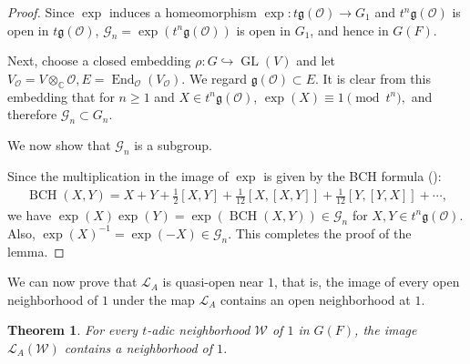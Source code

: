 \documentclass[11pt]{amsart}
\numberwithin{equation}{section}
\newtheorem{theorem}{Theorem}[section]
\theoremstyle{definition}
\theoremstyle{remark}
\begin{document}
\begin{proof}
Since $\exp$ induces a homeomorphism $\exp:t\mathfrak{g}(\mathcal{O})\rightarrow G_{1}$ and $t^n\mathfrak g(\mathcal O)$ is open in
$t\mathfrak g(\mathcal O)$, $\mathcal G_n=\exp(t^n\mathfrak{g}(\mathcal{O}))$ is open in $G_1$, and hence in
$G(F)$.

Next, choose a closed embedding $\rho:G\hookrightarrow\operatorname{GL}(V)$ and let $V_{\mathcal O}=V\otimes_{\mathbb C}\mathcal O, E=\operatorname{End}_{\mathcal O}(V_{\mathcal O}).$
We regard $\mathfrak g(\mathcal{O}) \subset E.$
It is clear from this embedding that for $n\geq 1$ and $X\in t^n\mathfrak{g}(\mathcal{O})$, $\exp(X)\equiv1\pmod{t^n},$ and therefore $\mathcal G_n\subset G_n.$ 

We now show that $\mathcal G_n$ is a subgroup.

Since the multiplication in the image of $\exp$ is given by the BCH formula (\cite[Chapter~2, Section~6]{Bou}):
\begin{align}\label{eq:BCH}
  \operatorname{BCH}(X,Y)
  =
  X+Y+\frac12[X,Y]
  +\frac1{12}[X,[X,Y]]
  +\frac1{12}[Y,[Y,X]]
  +\cdots,
\end{align}
we have $\exp(X)\exp(Y)
  =\exp\!\left(\operatorname{BCH}(X,Y)\right)
  \in\mathcal G_n$ for $X,Y\in t^n\mathfrak g(\mathcal O)$. Also, $ \exp(X)^{-1}=\exp(-X)\in\mathcal G_n$.
This completes the proof of the lemma. 
\end{proof}
We can now prove that $\mathcal{L}_A$ is quasi-open near $1$, that is, the image of every open neighborhood of $1$ under the map $\mathcal{L}_{A}$ contains an open neighborhood at $1$. 
\begin{theorem}\label{thm:lang-open}
For every $t$-adic neighborhood $\mathcal W$ of $1$ in $G(F)$, the image
$\mathcal{L}_A(\mathcal W)$ contains a neighborhood of $1$.
\end{theorem}
\end{document}
